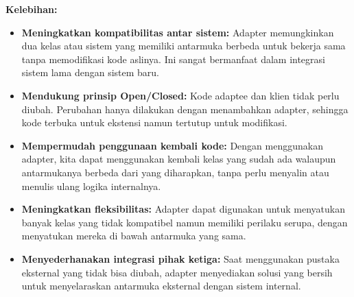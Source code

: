 \textbf{Kelebihan:}
\begin{itemize}
	\item \textbf{Meningkatkan kompatibilitas antar sistem:} Adapter memungkinkan dua kelas atau sistem yang memiliki antarmuka berbeda untuk bekerja sama tanpa memodifikasi kode aslinya. Ini sangat bermanfaat dalam integrasi sistem lama dengan sistem baru.
	
	\item \textbf{Mendukung prinsip Open/Closed:} Kode adaptee dan klien tidak perlu diubah. Perubahan hanya dilakukan dengan menambahkan adapter, sehingga kode terbuka untuk ekstensi namun tertutup untuk modifikasi.
	
	\item \textbf{Mempermudah penggunaan kembali kode:} Dengan menggunakan adapter, kita dapat menggunakan kembali kelas yang sudah ada walaupun antarmukanya berbeda dari yang diharapkan, tanpa perlu menyalin atau menulis ulang logika internalnya.
	
	\item \textbf{Meningkatkan fleksibilitas:} Adapter dapat digunakan untuk menyatukan banyak kelas yang tidak kompatibel namun memiliki perilaku serupa, dengan menyatukan mereka di bawah antarmuka yang sama.
	
	\item \textbf{Menyederhanakan integrasi pihak ketiga:} Saat menggunakan pustaka eksternal yang tidak bisa diubah, adapter menyediakan solusi yang bersih untuk menyelaraskan antarmuka eksternal dengan sistem internal.
\end{itemize}

